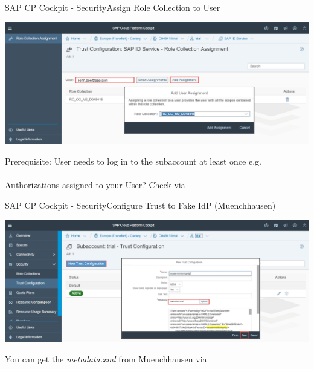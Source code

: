 \begin{frame}[t]{SAP CP Cockpit - Security}{Assign Role Collection to User}
\centerline{\includegraphics[width=\textwidth]{../Security/images/CockpitRoleCollectionAssignToUser}}
\vfill
\scriptsize
Prerequisite: User needs to log in to the subaccount at least once e.g. 
\\\\
\vfill
Authorizations assigned to your User? Check via 
\\
\end{frame}

\begin{frame}[t]{SAP CP Cockpit - Security}{Configure Trust to Fake IdP (Muenchhausen)}
\centerline{\includegraphics[width=\textwidth]{../Security/images/AddMuenchhausenFakeIdP}}
\vfill
\scriptsize
You can get the \textit{metadata.xml} from Muenchhausen via 
\end{frame}


